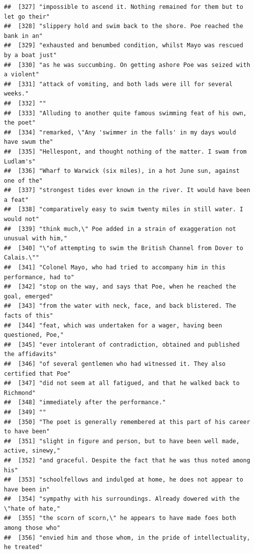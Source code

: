 \documentclass{article}\usepackage[]{graphicx}\usepackage[]{color}
\makeatletter
\newenvironment{kframe}{%
 \def\at@end@of@kframe{}%
 \ifinner\ifhmode%
  \def\at@end@of@kframe{\end{minipage}}%
  \begin{minipage}{\columnwidth}%
 \fi\fi%
 \def\FrameCommand##1{\hskip\@totalleftmargin \hskip-\fboxsep
 \colorbox{shadecolor}{##1}\hskip-\fboxsep
     \hskip-\linewidth \hskip-\@totalleftmargin \hskip\columnwidth}%
 \MakeFramed {\advance\hsize-\width
   \@totalleftmargin\z@ \linewidth\hsize
   \@setminipage}}%
 {\par\unskip\endMakeFramed%
 \at@end@of@kframe}
\newenvironment{knitrout}{}{} %
\makeatother
\begin{document}
\begin{knitrout}
\begin{kframe}
\begin{verbatim}
##  [327] "impossible to ascend it. Nothing remained for them but to let go their"      
##  [328] "slippery hold and swim back to the shore. Poe reached the bank in an"        
##  [329] "exhausted and benumbed condition, whilst Mayo was rescued by a boat just"    
##  [330] "as he was succumbing. On getting ashore Poe was seized with a violent"       
##  [331] "attack of vomiting, and both lads were ill for several weeks."               
##  [332] ""                                                                            
##  [333] "Alluding to another quite famous swimming feat of his own, the poet"         
##  [334] "remarked, \"Any 'swimmer in the falls' in my days would have swum the"       
##  [335] "Hellespont, and thought nothing of the matter. I swam from Ludlam's"         
##  [336] "Wharf to Warwick (six miles), in a hot June sun, against one of the"         
##  [337] "strongest tides ever known in the river. It would have been a feat"          
##  [338] "comparatively easy to swim twenty miles in still water. I would not"         
##  [339] "think much,\" Poe added in a strain of exaggeration not unusual with him,"   
##  [340] "\"of attempting to swim the British Channel from Dover to Calais.\""         
##  [341] "Colonel Mayo, who had tried to accompany him in this performance, had to"    
##  [342] "stop on the way, and says that Poe, when he reached the goal, emerged"       
##  [343] "from the water with neck, face, and back blistered. The facts of this"       
##  [344] "feat, which was undertaken for a wager, having been questioned, Poe,"        
##  [345] "ever intolerant of contradiction, obtained and published the affidavits"     
##  [346] "of several gentlemen who had witnessed it. They also certified that Poe"     
##  [347] "did not seem at all fatigued, and that he walked back to Richmond"           
##  [348] "immediately after the performance."                                          
##  [349] ""                                                                            
##  [350] "The poet is generally remembered at this part of his career to have been"    
##  [351] "slight in figure and person, but to have been well made, active, sinewy,"    
##  [352] "and graceful. Despite the fact that he was thus noted among his"             
##  [353] "schoolfellows and indulged at home, he does not appear to have been in"      
##  [354] "sympathy with his surroundings. Already dowered with the \"hate of hate,"    
##  [355] "the scorn of scorn,\" he appears to have made foes both among those who"     
##  [356] "envied him and those whom, in the pride of intellectuality, he treated"      

\end{verbatim}
\end{kframe}
\end{knitrout}
\end{document}
